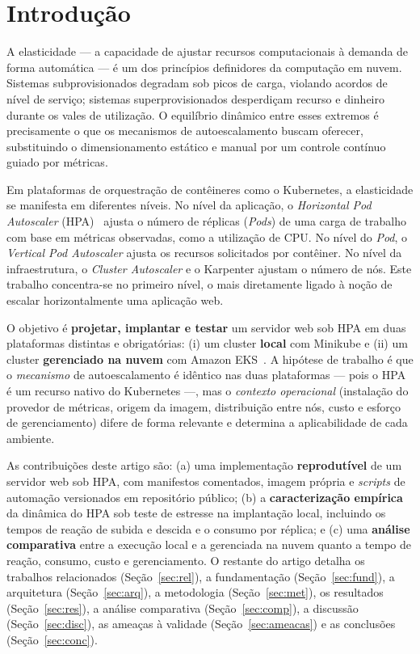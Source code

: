 \documentclass[conference]{IEEEtran}
\begin{document}
\section{Introdução}
A elasticidade --- a capacidade de ajustar recursos computacionais à demanda de forma automática
--- é um dos princípios definidores da computação em nuvem. Sistemas subprovisionados degradam
sob picos de carga, violando acordos de nível de serviço; sistemas superprovisionados
desperdiçam recurso e dinheiro durante os vales de utilização. O equilíbrio dinâmico entre esses
extremos é precisamente o que os mecanismos de autoescalamento buscam oferecer, substituindo o
dimensionamento estático e manual por um controle contínuo guiado por métricas.

Em plataformas de orquestração de contêineres como o Kubernetes, a elasticidade se manifesta em
diferentes níveis. No nível da aplicação, o \textit{Horizontal Pod Autoscaler}
(HPA)~\cite{k8shpa} ajusta o número de réplicas (\textit{Pods}) de uma carga de trabalho com base
em métricas observadas, como a utilização de CPU. No nível do \textit{Pod}, o \textit{Vertical
Pod Autoscaler} ajusta os recursos solicitados por contêiner. No nível da infraestrutura, o
\textit{Cluster Autoscaler} e o Karpenter ajustam o número de nós. Este trabalho concentra-se no
primeiro nível, o mais diretamente ligado à noção de escalar horizontalmente uma aplicação web.

O objetivo é \textbf{projetar, implantar e testar} um servidor web sob HPA em duas plataformas
distintas e obrigatórias: (i) um cluster \textbf{local} com Minikube e (ii) um cluster
\textbf{gerenciado na nuvem} com Amazon EKS~\cite{ekshpa}. A hipótese de trabalho é que o
\emph{mecanismo} de autoescalamento é idêntico nas duas plataformas --- pois o HPA é um recurso
nativo do Kubernetes ---, mas o \emph{contexto operacional} (instalação do provedor de métricas,
origem da imagem, distribuição entre nós, custo e esforço de gerenciamento) difere de forma
relevante e determina a aplicabilidade de cada ambiente.

As contribuições deste artigo são: (a) uma implementação \textbf{reprodutível} de um servidor web
sob HPA, com manifestos comentados, imagem própria e \textit{scripts} de automação versionados em
repositório público; (b) a \textbf{caracterização empírica} da dinâmica do HPA sob teste de
estresse na implantação local, incluindo os tempos de reação de subida e descida e o consumo por
réplica; e (c) uma \textbf{análise comparativa} entre a execução local e a gerenciada na nuvem
quanto a tempo de reação, consumo, custo e gerenciamento. O restante do artigo detalha os
trabalhos relacionados (Seção~\ref{sec:rel}), a fundamentação (Seção~\ref{sec:fund}), a
arquitetura (Seção~\ref{sec:arq}), a metodologia (Seção~\ref{sec:met}), os resultados
(Seção~\ref{sec:res}), a análise comparativa (Seção~\ref{sec:comp}), a discussão
(Seção~\ref{sec:disc}), as ameaças à validade (Seção~\ref{sec:ameacas}) e as conclusões
(Seção~\ref{sec:conc}).
\end{document}

